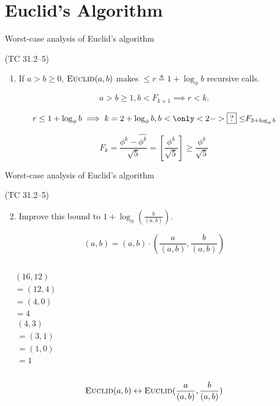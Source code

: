 \section{Euclid's Algorithm}

\begin{frame}{Worst-case analysis of Euclid's algorithm}
  \begin{exampleblock}{(TC 31.2--5)}
	\begin{enumerate}
	  \item If $a > b \ge 0$, $\textsc{Euclid}(a,b)$ makes $\le r \triangleq 1 + \log_{\phi}b$ recursive calls.
	\end{enumerate}
  \end{exampleblock}

  \[
	a > b \ge 1, b < F_{k+1} \implies r < k.
  \]

  \[
	r \le 1 + \log_{\phi}b \implies k = 2 + \log_{\phi}b, b < \only<2->{\boxed{?} \le} F_{3 + \log_{\phi}b}
  \]

  \[
	F_k = \frac{\phi^{k} - \hat{\phi^{k}}}{\sqrt{5}} = [\frac{\phi^{k}}{\sqrt{5}}] \ge \frac{\phi^{k}}{\sqrt{5}}
  \]
\end{frame}
\begin{frame}{Worst-case analysis of Euclid's algorithm}
  \begin{exampleblock}{(TC 31.2--5)}
	\begin{enumerate}
	  \setcounter{enumi}{1}
	  \item Improve this bound to $1 + \log_{\phi}(\frac{b}{(a,b)})$.
	\end{enumerate}
  \end{exampleblock}

  \pause
  \[
	(a,b) = (a,b) \cdot (\frac{a}{(a,b)}, \frac{b}{(a,b)})
  \]

  \pause
  \vspace{-0.20cm}
  \begin{columns}
	  \begin{align*}
		&(16,12) \\
		&=(12,4) \\
		&=(4,0) \\
		&=4
	  \end{align*}
	  \begin{align*}
		&(4,3) \\
		&=(3,1) \\
		&=(1,0) \\
		&=1
	  \end{align*}
  \end{columns}
  
  \pause
  \[
	\textsc{Euclid}(a,b) \leftrightarrow \textsc{Euclid}(\frac{a}{(a,b)}, \frac{b}{(a,b)})
  \]
\end{frame}
